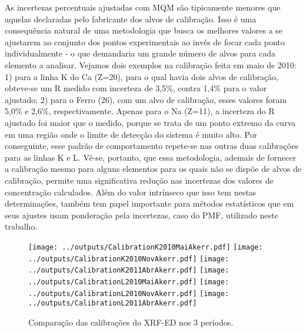 As incertezas percentuais ajustadas com MQM são tipicamente menores que aquelas 
declaradas pelo fabricante dos alvos de calibração. Isso é uma consequência 
natural de uma metodologia que busca os melhores valores a se ajustarem ao 
conjunto dos pontos experimentais ao invés de focar cada ponto individualmente -
o que demandaria um grande número de alvos para cada elemento a analisar. 
Vejamos dois exemplos na calibração feita em maio de 2010: 
1) para a linha K do Ca (Z=20), para o qual havia dois alvos de calibração, 
obteve-se um R medido com incerteza de 3,5\%, contra 1,4\% para o valor ajustado; 
2) para o Ferro (26), com um alvo de calibração, esses valores foram 5,0\% e 
2,6\%, respectivamente. Apenas para o Na (Z=11), a incerteza do R ajustado foi 
maior que o medido, porque se trata de um ponto extremo da curva em uma 
região onde o limite de detecção do sistema é muito alto. Por conseguinte, esse 
padrão de comportamento repete-se nas outras duas calibrações para as linhas K 
e L.
Vê-se, portanto, que essa metodologia, ademais de fornecer a calibração mesmo 
para alguns elementos para os quais não se dispõe de alvos de calibração, 
permite uma significativa redução nas incertezas dos valores de concentração 
calculados. Além do valor intrínseco que isso tem nestas determinações, 
também tem papel importante para métodos estatísticos que em seus ajustes 
usam ponderação pela incertezas, caso do PMF, utilizado neste trabalho.

\begin{landscape}
\begin{figure}
    \centering
    \texttt{[image: ../outputs/CalibrationK2010MaiAkerr.pdf]}
    \texttt{[image: ../outputs/CalibrationK2010NovAkerr.pdf]}
    \texttt{[image: ../outputs/CalibrationK2011AbrAkerr.pdf]}
    \texttt{[image: ../outputs/CalibrationL2010MaiAkerr.pdf]}
    \texttt{[image: ../outputs/CalibrationL2010NovAkerr.pdf]}
    \texttt{[image: ../outputs/CalibrationL2011AbrAkerr.pdf]}
    \caption{Comparação das calibrações do XRF-ED nos 3 períodos. 
            \label{fig:edx_calib3}}
\end{figure}
\end{landscape}

\begin{landscape}
  
\end{landscape}

\begin{landscape}
  
\end{landscape}

